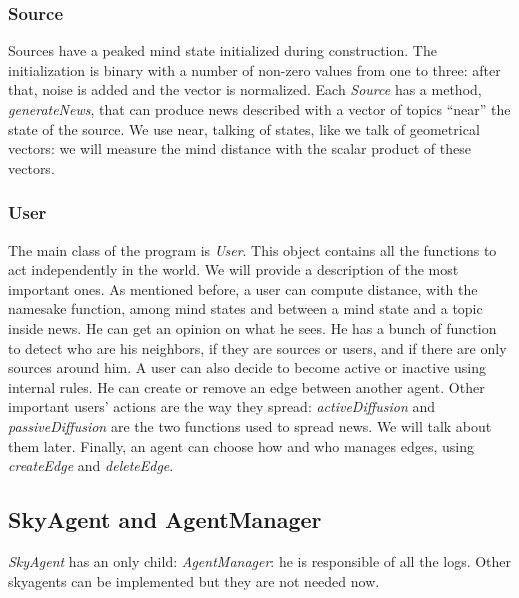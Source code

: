 \subsubsection{Source}\label{subsubsec:source}
Sources have a peaked mind state initialized during construction.
The initialization is binary with a number of non-zero values from one to three:
after that, noise is added and the vector is normalized.
Each \textit{Source} has a method, \textit{generateNews}, that can produce
news described with a vector of topics ``near'' the state of the source.
We use near, talking of states, like we talk of geometrical vectors: we will
measure the mind distance with the scalar product of these vectors.

\subsubsection{User}\label{subsubsec:user}
The main class of the program is \textit{User}.
This object contains all the functions to act independently in the world.
We will provide a description of the most important ones.
As mentioned before, a user can compute distance, with the namesake
function, among mind states and between a mind state and a
topic inside news. He can get an opinion on what he sees.
He has a bunch of function to detect who are his neighbors, if they
are sources or users, and if there are only sources around him.
A user can also decide to become active or inactive using internal rules.
He can create or remove an edge between another agent.
Other important users' actions are the way they spread:
\textit{activeDiffusion} and \textit{passiveDiffusion} are the
two functions used to spread news. We will talk about them later.
Finally, an agent can choose how and who manages edges, using
\textit{createEdge} and \textit{deleteEdge}.

\subsection{SkyAgent and AgentManager}\label{subsec:skyagent}
\textit{SkyAgent} has an only child: \textit{AgentManager}: he is
responsible of all the logs.
Other skyagents can be implemented but they are not needed now.

